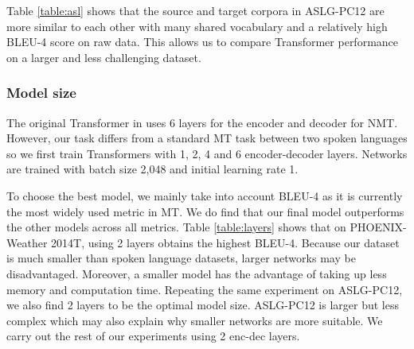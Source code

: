 \documentclass[11pt]{article}
\begin{document}
Table \ref{table:asl} shows that the source and target corpora in ASLG-PC12 are more similar to each other with many shared vocabulary and a relatively high BLEU-4 score on raw data. This allows us to compare Transformer performance on a larger and less challenging dataset. 


\subsubsection*{Model size}
The original Transformer in \cite{transformer} uses 6 layers for the encoder and decoder for NMT. However, our task differs from a standard MT task between two spoken languages so we first train Transformers with 1, 2, 4 and 6 encoder-decoder layers. Networks are trained with batch size 2,048 and initial learning rate 1. 

\begin{center}
\label{table:layers}
\end{center}

To choose the best model, we mainly take into account BLEU-4 as it is currently the most widely used metric in MT. We do find that our final model outperforms the other models across all metrics. Table \ref{table:layers} shows that on PHOENIX-Weather 2014T, using 2 layers obtains the highest BLEU-4. Because our dataset is much smaller than spoken language datasets, larger networks may be disadvantaged. Moreover, a smaller model has the advantage of taking up less memory and computation time. Repeating the same experiment on ASLG-PC12, we also find 2 layers to be the optimal model size. ASLG-PC12 is larger but less complex which may also explain why smaller networks are more suitable. We carry out the rest of our experiments using 2 enc-dec layers.
\end{document}
